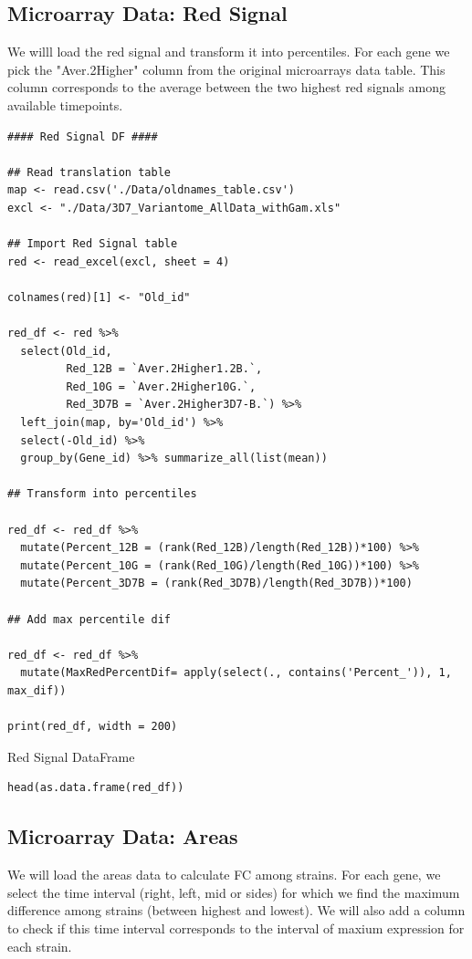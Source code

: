 \documentclass[11pt]{article}
\begin{document}
\subsection{Microarray Data: Red Signal}
\label{sec:org806235c}
We willl load the red signal and transform it into percentiles. For each gene we pick the "Aver.2Higher" column from the original microarrays data table. This column corresponds to the average between the two highest red signals among available timepoints.

\begin{verbatim}
#### Red Signal DF ####

## Read translation table
map <- read.csv('./Data/oldnames_table.csv')
excl <- "./Data/3D7_Variantome_AllData_withGam.xls"

## Import Red Signal table
red <- read_excel(excl, sheet = 4)

colnames(red)[1] <- "Old_id"

red_df <- red %>%
  select(Old_id,
         Red_12B = `Aver.2Higher1.2B.`,
         Red_10G = `Aver.2Higher10G.`,
         Red_3D7B = `Aver.2Higher3D7-B.`) %>%
  left_join(map, by='Old_id') %>%
  select(-Old_id) %>%
  group_by(Gene_id) %>% summarize_all(list(mean))

## Transform into percentiles

red_df <- red_df %>%
  mutate(Percent_12B = (rank(Red_12B)/length(Red_12B))*100) %>%
  mutate(Percent_10G = (rank(Red_10G)/length(Red_10G))*100) %>%
  mutate(Percent_3D7B = (rank(Red_3D7B)/length(Red_3D7B))*100)

## Add max percentile dif

red_df <- red_df %>%
  mutate(MaxRedPercentDif= apply(select(., contains('Percent_')), 1, max_dif))

print(red_df, width = 200)
\end{verbatim}

Red Signal DataFrame
\begin{verbatim}
head(as.data.frame(red_df))
\end{verbatim}

\subsection{Microarray Data: Areas}
\label{sec:orge01dae2}
We will load the areas data to calculate FC among strains. For each gene, we select the time interval (right, left, mid or sides) for which we find the maximum difference among strains (between highest and lowest). We will also add a column to check if this time interval corresponds to the interval of maxium expression for each strain.
\end{document}
